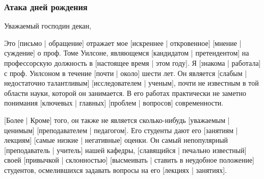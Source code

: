 \documentclass[xetex,mathserif,serif]{beamer}
\begin{document}
	\begin{frame}
		\frametitle{Атака дней рождения}
		\begin{scriptsize}
Уважаемый господин декан,

\vspace{3mm}

Это [письмо | обращение] отражает мое [искреннее | откровенное] [мнение | суждение] о проф. Томе Уилсоне, являющемся [кандидатом | претендентом] на профессорскую должность в [настоящее время | этом году]. Я [знакома | работала] с проф. Уилсоном в течение [почти | около] шести лет. Он является [слабым | недостаточно талантливым] [исследователем | ученым], почти не известным в той области науки, которой он занимается. В его работах практически не заметно понимания [ключевых | главных] [проблем | вопросов] современности.

\vspace{3mm}

[Более | Кроме] того, он также не является сколько-нибудь [уважаемым | ценимым] [преподавателем | педагогом]. Его студенты дают его [занятиям | лекциям] [самые низкие | негативные] оценки. Он самый непопулярный [преподаватель | учитель] нашей кафедры, [славящийся | печально известный] своей [привычкой | склонностью] [высмеивать | ставить в неудобное положение] студентов, осмелившихся задавать вопросы на его [лекциях | занятиях].

\vspace{3mm}

		\end{scriptsize}
	\end{frame}
\end{document}
